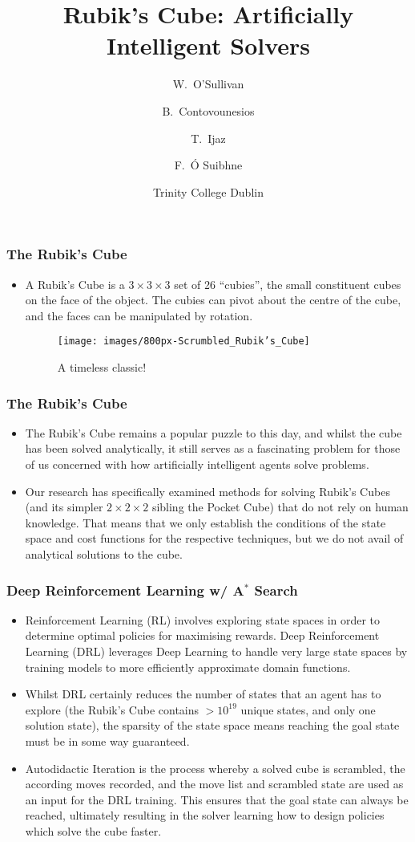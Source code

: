 \documentclass[UKenglish]{beamer}
\title[CS7IS2 Project Presentation] %
{Rubik's Cube: Artificially Intelligent Solvers}
\author[O'Sullivan, William] %
{W.~O'Sullivan\inst{1} \and B.~Contovounesios\inst{2} \and T.~Ijaz\inst{3} \and F.~\'O Suibhne\inst{1}}
\institute[TCD] %
{
  \inst{1}%
  High Performance Computing MSc\\
  School of Maths
  \and
  \inst{2}%
  Integrated Computer Science BA \& MCS\\
  School of Computer Science \& Statistics
  \and
  \inst{3}%
  Computer Science: Intelligent Systems MSc\\
  School of Computer Science \& Statistics
}
\date[25/04/21] %
{Trinity College Dublin}
\begin{document}
\frame{\titlepage}

\begin{frame}
\frametitle{The Rubik's Cube}
\begin{itemize}
    \item A Rubik's Cube is a $3\times 3\times 3$ set of 26 ``cubies'', the small constituent cubes on the face of the object. The cubies can pivot about the centre of the cube, and the faces can be manipulated by rotation.

\begin{figure}
\centering
\texttt{[image: images/800px-Scrumbled\_Rubik's\_Cube]}
\caption{A timeless classic!}
\label{fig:fig10}
\end{figure}

\end{itemize}

\end{frame}

\begin{frame}
\frametitle{The Rubik's Cube}
\begin{itemize}
    \item The Rubik's Cube remains a popular puzzle to this day, and whilst the cube has been solved analytically, it still serves as a fascinating problem for those of us concerned with how artificially intelligent agents solve problems.
    \item Our research has specifically examined methods for solving Rubik's Cubes (and its simpler $2\times 2\times 2$ sibling the Pocket Cube) that do not rely on human knowledge. That means that we only establish the conditions of the state space and cost functions for the respective techniques, but we do not avail of analytical solutions to the cube.
\end{itemize}

\end{frame}

\begin{frame}
\frametitle{Deep Reinforcement Learning w/ A$^\ast$ Search}
\begin{itemize}
    \item Reinforcement Learning (RL) involves exploring state spaces in order to determine optimal policies for maximising rewards. Deep Reinforcement Learning (DRL) leverages Deep Learning to handle very large state spaces by training models to more efficiently approximate domain functions.
    \item Whilst DRL certainly reduces the number of states that an agent has to explore (the Rubik's Cube contains $ > 10^{19}$ unique states, and only one solution state), the sparsity of the state space means reaching the goal state must be in some way guaranteed.
    \item Autodidactic Iteration is the process whereby a solved cube is scrambled, the according moves recorded, and the move list and scrambled state are used as an input for the DRL training. This ensures that the goal state can always be reached, ultimately resulting in the solver learning how to design policies which solve the cube faster.
\end{itemize}
\end{frame}
\end{document}
